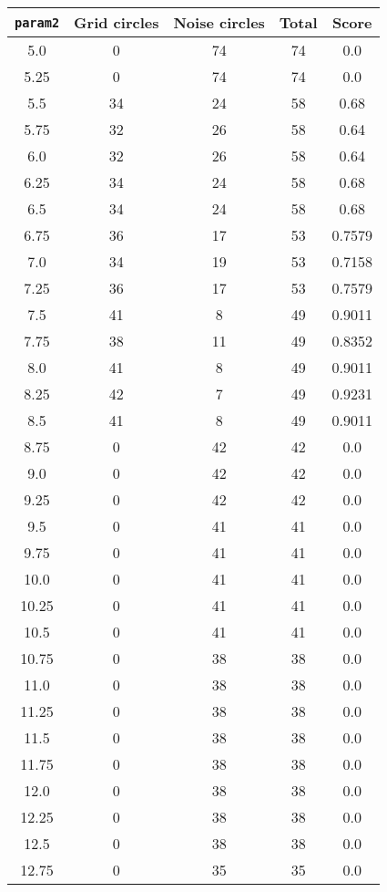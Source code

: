 \documentclass[letterpaper, 12pt]{article}
\begin{document}
\begin{longtable}{|c|c|c|c|c|}
\hline
\textbf{\texttt{param2}} & \textbf{Grid circles} & \textbf{Noise circles} & \textbf{Total} & \textbf{Score} \\
\hline
5.0 & 0 & 74 & 74 & 0.0 \\
\hline
5.25 & 0 & 74 & 74 & 0.0 \\
\hline
5.5 & 34 & 24 & 58 & 0.68 \\
\hline
5.75 & 32 & 26 & 58 & 0.64 \\
\hline
6.0 & 32 & 26 & 58 & 0.64 \\
\hline
6.25 & 34 & 24 & 58 & 0.68 \\
\hline
6.5 & 34 & 24 & 58 & 0.68 \\
\hline
6.75 & 36 & 17 & 53 & 0.7579 \\
\hline
7.0 & 34 & 19 & 53 & 0.7158 \\
\hline
7.25 & 36 & 17 & 53 & 0.7579 \\
\hline
7.5 & 41 & 8 & 49 & 0.9011 \\
\hline
7.75 & 38 & 11 & 49 & 0.8352 \\
\hline
8.0 & 41 & 8 & 49 & 0.9011 \\
\hline
8.25 & 42 & 7 & 49 & 0.9231 \\
\hline
8.5 & 41 & 8 & 49 & 0.9011 \\
\hline
8.75 & 0 & 42 & 42 & 0.0 \\
\hline
9.0 & 0 & 42 & 42 & 0.0 \\
\hline
9.25 & 0 & 42 & 42 & 0.0 \\
\hline
9.5 & 0 & 41 & 41 & 0.0 \\
\hline
9.75 & 0 & 41 & 41 & 0.0 \\
\hline
10.0 & 0 & 41 & 41 & 0.0 \\
\hline
10.25 & 0 & 41 & 41 & 0.0 \\
\hline
10.5 & 0 & 41 & 41 & 0.0 \\
\hline
10.75 & 0 & 38 & 38 & 0.0 \\
\hline
11.0 & 0 & 38 & 38 & 0.0 \\
\hline
11.25 & 0 & 38 & 38 & 0.0 \\
\hline
11.5 & 0 & 38 & 38 & 0.0 \\
\hline
11.75 & 0 & 38 & 38 & 0.0 \\
\hline
12.0 & 0 & 38 & 38 & 0.0 \\
\hline
12.25 & 0 & 38 & 38 & 0.0 \\
\hline
12.5 & 0 & 38 & 38 & 0.0 \\
\hline
12.75 & 0 & 35 & 35 & 0.0 \\

\end{longtable}
\end{document}
